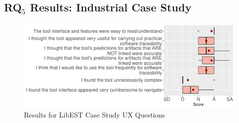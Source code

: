 \subsection{RQ$_5$ Results: Industrial Case Study}
\label{sub:results-rq6}

\begin{figure}[h]
\centering
\includegraphics[width=\columnwidth]{graphics/chap_04-bayes/fig5_libest_boxplot.pdf}
\caption{Results for LibEST Case Study UX Questions}
\label{fig:LibEST-study}
\end{figure}

